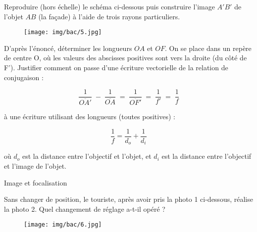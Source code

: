 \documentclass[answers]{exam}
\begin{document}
\begin{questions}

\question[1] Reproduire (hors échelle) le schéma ci-dessous puis construire l'image $A'B'$ de l'objet $AB$ (la façade) à l'aide de trois rayons particuliers.

\begin{figure}[H]
  \centering
  \texttt{[image: img/bac/5.jpg]}
\end{figure}


\question[1] D'après l'énoncé, déterminer les longueurs $OA$ et $OF$. On se place dans un repère de centre O, où les valeurs des abscisses positives sont vers la droite (du côté de F'). Justifier comment on passe d'une écriture vectorielle de la relation de conjugaison :

\[
  \frac{1}{\overline{OA'}} \;-\; \frac{1}{\overline{OA}}
  \;=\; \frac{1}{\overline{OF'}} 
  \;=\; \frac{1}{f'}
  \;=\; \frac{1}{f}
\]

à une écriture utilisant des longueurs (toutes positives) :

\[
  \frac{1}{f} = \frac{1}{d_o} + \frac{1}{d_i}
\]

où $d_o$ est la distance entre l'objectif et l'objet, et $d_i$ est la distance entre l'objectif et l'image de l'objet.


\question[4] Image et focalisation


\question[1] Sans changer de position, le touriste, après avoir pris la photo 1 ci-dessous, réalise la photo 2. Quel changement de réglage a-t-il opéré ?

\begin{figure}[H]
  \centering
  \texttt{[image: img/bac/6.jpg]}
\end{figure}

\end{questions}
\end{document}
